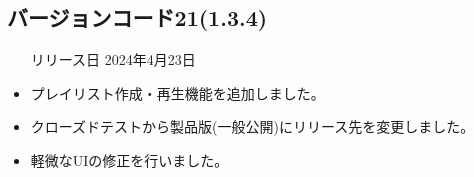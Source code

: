 \subsection*{バージョンコード21(1.3.4)}
\begin{itemize}
    \item[リリース日] 2024年4月23日
\end{itemize}

\new
\begin{itemize}
    \item プレイリスト作成・再生機能を追加しました。
\end{itemize}

\change
\begin{itemize}
    \item クローズドテストから製品版(一般公開)にリリース先を変更しました。
\end{itemize}

\fix
\begin{itemize}
    \item 軽微なUIの修正を行いました。
\end{itemize}

